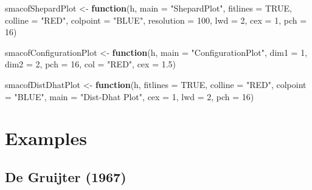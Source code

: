 \documentclass[
  12pt,
]{article}
\newenvironment{Shaded}{\begin{snugshade}}{\end{snugshade}}
\newcommand{\AttributeTok}[1]{\textcolor[rgb]{0.13,0.29,0.53}{#1}}
\newcommand{\ConstantTok}[1]{\textcolor[rgb]{0.56,0.35,0.01}{#1}}
\newcommand{\ControlFlowTok}[1]{\textcolor[rgb]{0.13,0.29,0.53}{\textbf{#1}}}
\newcommand{\DecValTok}[1]{\textcolor[rgb]{0.00,0.00,0.81}{#1}}
\newcommand{\FloatTok}[1]{\textcolor[rgb]{0.00,0.00,0.81}{#1}}
\newcommand{\NormalTok}[1]{#1}
\newcommand{\OtherTok}[1]{\textcolor[rgb]{0.56,0.35,0.01}{#1}}
\newcommand{\StringTok}[1]{\textcolor[rgb]{0.31,0.60,0.02}{#1}}
\begin{document}
\begin{Shaded}
\begin{Highlighting}[]
\NormalTok{smacofShepardPlot }\OtherTok{\textless{}{-}}
  \ControlFlowTok{function}\NormalTok{(h,}
           \AttributeTok{main =} \StringTok{"ShepardPlot"}\NormalTok{,}
           \AttributeTok{fitlines =} \ConstantTok{TRUE}\NormalTok{,}
           \AttributeTok{colline =} \StringTok{"RED"}\NormalTok{,}
           \AttributeTok{colpoint =} \StringTok{"BLUE"}\NormalTok{,}
           \AttributeTok{resolution =} \DecValTok{100}\NormalTok{,}
           \AttributeTok{lwd =} \DecValTok{2}\NormalTok{,}
           \AttributeTok{cex =} \DecValTok{1}\NormalTok{,}
           \AttributeTok{pch =} \DecValTok{16}\NormalTok{)}
           
\NormalTok{smacofConfigurationPlot }\OtherTok{\textless{}{-}}
  \ControlFlowTok{function}\NormalTok{(h,}
           \AttributeTok{main =} \StringTok{"ConfigurationPlot"}\NormalTok{,}
           \AttributeTok{dim1 =} \DecValTok{1}\NormalTok{,}
           \AttributeTok{dim2 =} \DecValTok{2}\NormalTok{,}
           \AttributeTok{pch =} \DecValTok{16}\NormalTok{,}
           \AttributeTok{col =} \StringTok{"RED"}\NormalTok{,}
           \AttributeTok{cex =} \FloatTok{1.5}\NormalTok{)}
           
\NormalTok{smacofDistDhatPlot }\OtherTok{\textless{}{-}} \ControlFlowTok{function}\NormalTok{(h,}
                               \AttributeTok{fitlines =} \ConstantTok{TRUE}\NormalTok{,}
                               \AttributeTok{colline =} \StringTok{"RED"}\NormalTok{,}
                               \AttributeTok{colpoint =} \StringTok{"BLUE"}\NormalTok{,}
                               \AttributeTok{main =} \StringTok{"Dist{-}Dhat Plot"}\NormalTok{,}
                               \AttributeTok{cex =} \DecValTok{1}\NormalTok{,}
                               \AttributeTok{lwd =} \DecValTok{2}\NormalTok{,}
                               \AttributeTok{pch =} \DecValTok{16}\NormalTok{)}
\end{Highlighting}
\end{Shaded}

\section{Examples}\label{examples}

\subsection{De Gruijter (1967)}\label{degruijter_67}
\end{document}
